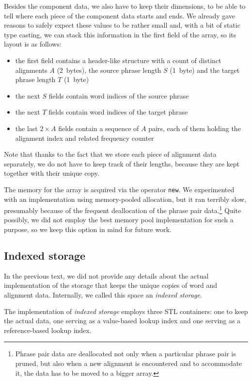 Besides the component data, we also have to keep their dimensions,
to be able to tell where each piece of the component data starts and ends.
We already gave reasons to safely expect these values to be rather small and,
with a bit of static type casting, we can stack this information in the first
field of the array, so its layout is as follows:
\begin{itemize}
  \item the first field contains a header-like structure with a count
    of distinct alignments $A$ (2~bytes),
    the source phrase length $S$ (1~byte) and the target phrase length $T$ (1~byte)
  \item the next $S$ fields contain word indices of the source phrase
  \item the next $T$ fields contain word indices of the target phrase
  \item the last $2 \times A$ fields contain a sequence of $A$ pairs, each of them
    holding the alignment index and related frequency counter
\end{itemize}

Note that thanks to the fact that we store each piece of alignment data separately, we do not
have to keep track of their lengths, because they are kept together with their unique copy.

The memory for the array is acquired via the operator \texttt{new}.
We experimented with an implementation using memory-pooled allocation,
but it ran terribly slow, presumably because of the frequent deallocation
of the phrase pair data.\footnote{Phrase pair data are deallocated not only
when a particular phrase pair is pruned, but also when a new alignment is
encountered and to accommodate it, the data has to be moved to a bigger array.}
Quite possibly, we did not employ the best memory pool implementation for such
a purpose, so we keep this option in mind for future work.

\subsection{Indexed storage}

In the previous text, we did not provide any details about the actual implementation of
the storage that keeps the unique copies of word and alignment data.
Internally, we called this space an \emph{indexed storage}.

The implementation of \emph{indexed storage} employs three STL containers: one to keep
the actual data, one serving as a value-based lookup index and one serving as
a reference-based lookup index.

